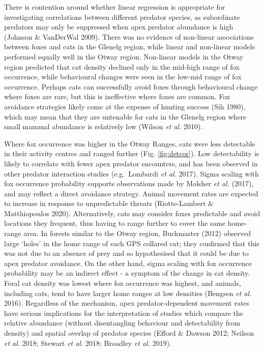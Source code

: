 \documentclass[]{elsarticle} %
\begin{document}
There is contention around whether linear regression is appropriate for investigating correlations between different predator species, as subordinate predators may only be suppressed when apex predator abundance is high (Johnson \& VanDerWal 2009). There was no evidence of non-linear associations between foxes and cats in the Glenelg region, while linear and non-linear models performed equally well in the Otway region. Non-linear models in the Otway region predicted that cat density declined only in the mid-high range of fox occurrence, while behavioural changes were seen in the low-mid range of fox occurrence. Perhaps cats can successfully avoid foxes through behavioural change where foxes are rare, but this is ineffective where foxes are common. Fox avoidance strategies likely come at the expense of hunting success (Sih 1980), which may mean that they are untenable for cats in the Glenelg region where small mammal abundance is relatively low (Wilson \emph{et al.} 2010).

Where fox occurrence was higher in the Otway Ranges, cats were less detectable in their activity centres and ranged further (Fig. \ref{fig:detcor}). Low detectability is likely to correlate with fewer apex predator encounters, and has been observed in other predator interaction studies (e.g.~Lombardi \emph{et al.} 2017). Sigma scaling with fox occurrence probability supports observations made by Molsher \emph{et al.} (2017), and may reflect a direct avoidance strategy. Animal movement rates are expected to increase in response to unpredictable threats (Riotte-Lambert \& Matthiopoulos 2020). Alternatively, cats may consider foxes predictable and avoid locations they frequent, thus having to range further to cover the same home-range area. In forests similar to the Otway region, Buckmaster (2012) observed large `holes' in the home range of each GPS collared cat; they confirmed that this was not due to an absence of prey and so hypothesised that it could be due to apex predator avoidance. On the other hand, sigma scaling with fox occurrence probability may be an indirect effect - a symptom of the change in cat density. Feral cat density was lowest where fox occurrence was highest, and animals, including cats, tend to have larger home ranges at low densities (Bengsen \emph{et al.} 2016). Regardless of the mechanism, apex predator-dependent movement rates have serious implications for the interpretation of studies which compare the relative abundance (without disentangling behaviour and detectability from density) and spatial overlap of predator species (Efford \& Dawson 2012; Neilson \emph{et al.} 2018; Stewart \emph{et al.} 2018; Broadley \emph{et al.} 2019).
\end{document}
